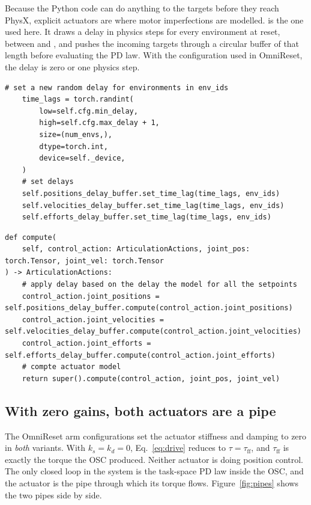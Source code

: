 Because the Python code can do anything to the targets before they reach PhysX, explicit actuators are where motor imperfections are modelled.  is the one used here. It draws a delay in physics steps for every environment at reset, between  and , and pushes the incoming targets through a circular buffer of that length before evaluating the PD law. With the configuration used in OmniReset, the delay is zero or one physics step.

\begin{snippetbox}[11]
\begin{lstlisting}[firstnumber=486]
    # set a new random delay for environments in env_ids
    time_lags = torch.randint(
        low=self.cfg.min_delay,
        high=self.cfg.max_delay + 1,
        size=(num_envs,),
        dtype=torch.int,
        device=self._device,
    )
    # set delays
    self.positions_delay_buffer.set_time_lag(time_lags, env_ids)
    self.velocities_delay_buffer.set_time_lag(time_lags, env_ids)
    self.efforts_delay_buffer.set_time_lag(time_lags, env_ids)
\end{lstlisting}
\snippetelide
\begin{lstlisting}[firstnumber=503]
def compute(
    self, control_action: ArticulationActions, joint_pos: torch.Tensor, joint_vel: torch.Tensor
) -> ArticulationActions:
    # apply delay based on the delay the model for all the setpoints
    control_action.joint_positions = self.positions_delay_buffer.compute(control_action.joint_positions)
    control_action.joint_velocities = self.velocities_delay_buffer.compute(control_action.joint_velocities)
    control_action.joint_efforts = self.efforts_delay_buffer.compute(control_action.joint_efforts)
    # compte actuator model
    return super().compute(control_action, joint_pos, joint_vel)

\end{lstlisting}
\end{snippetbox}

\subsection{With zero gains, both actuators are a pipe}

The OmniReset arm configurations set the actuator stiffness and damping to zero in \emph{both} variants. With $k_s = k_d = 0$, Eq.~\eqref{eq:drive} reduces to $\tau = \tau_{\mathrm{ff}}$, and $\tau_{\mathrm{ff}}$ is exactly the torque the OSC produced. Neither actuator is doing position control. The only closed loop in the system is the task-space PD law inside the OSC, and the actuator is the pipe through which its torque flows. Figure~\ref{fig:pipes} shows the two pipes side by side.

